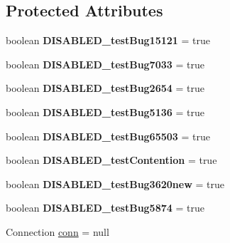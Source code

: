 \subsection*{Protected Attributes}
\begin{DoxyCompactItemize}
\item 
\mbox{\label{classtestsuite_1_1_base_test_case_ab7e16b70df00394f5d55e8047c3c2471}} 
boolean {\bfseries D\+I\+S\+A\+B\+L\+E\+D\+\_\+test\+Bug15121} = true
\item 
\mbox{\label{classtestsuite_1_1_base_test_case_aade0f7a71cb88d5c263fffd13a9581ac}} 
boolean {\bfseries D\+I\+S\+A\+B\+L\+E\+D\+\_\+test\+Bug7033} = true
\item 
\mbox{\label{classtestsuite_1_1_base_test_case_aa0c548e48f82aa602ab584c833f083ca}} 
boolean {\bfseries D\+I\+S\+A\+B\+L\+E\+D\+\_\+test\+Bug2654} = true
\item 
\mbox{\label{classtestsuite_1_1_base_test_case_ad648618fb57db1d2bfcf8c789334513f}} 
boolean {\bfseries D\+I\+S\+A\+B\+L\+E\+D\+\_\+test\+Bug5136} = true
\item 
\mbox{\label{classtestsuite_1_1_base_test_case_ae901da5e006e157035ca0394e61d39b3}} 
boolean {\bfseries D\+I\+S\+A\+B\+L\+E\+D\+\_\+test\+Bug65503} = true
\item 
\mbox{\label{classtestsuite_1_1_base_test_case_a366ca14a4b36186f1e93966bff8ae923}} 
boolean {\bfseries D\+I\+S\+A\+B\+L\+E\+D\+\_\+test\+Contention} = true
\item 
\mbox{\label{classtestsuite_1_1_base_test_case_abe1fd049ff5baefd7e28b26736b26329}} 
boolean {\bfseries D\+I\+S\+A\+B\+L\+E\+D\+\_\+test\+Bug3620new} = true
\item 
\mbox{\label{classtestsuite_1_1_base_test_case_a632731aff35d9e8b685332c73a4b70dd}} 
boolean {\bfseries D\+I\+S\+A\+B\+L\+E\+D\+\_\+test\+Bug5874} = true
\item 
Connection \mbox{\hyperlink{classtestsuite_1_1_base_test_case_a51c71d14ae22c75fb285989cc78b4730}{conn}} = null

\end{DoxyCompactItemize}

